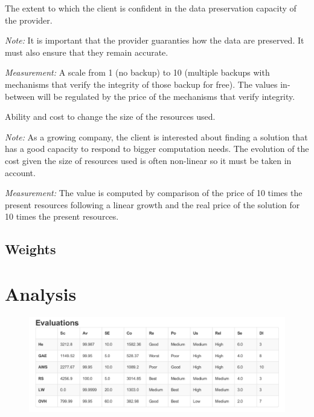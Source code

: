 \documentclass[a4paper,11pt]{article}
\begin{document}
\begin{description}[parsep=10pt,listparindent=\parindent,labelindent=\parindent,font=$\bullet$\ ]
  \item[Data Integrity:] The extent to which the client is confident in the data preservation capacity of the provider.
    \par \emph{Note:} It is important that the provider guaranties how the data are preserved. It must also ensure that they remain accurate.
    \par \emph{Measurement:} A scale from 1 (no backup) to 10 (multiple backups with mechanisms that verify the integrity of those backup for free). The values in-between will be regulated by the price of the mechanisms that verify integrity.

  \item[Scalability:] Ability and cost to change the size of the resources used.
    \par \emph{Note:} As a growing company, the client is interested about finding a solution that has a good capacity to respond to bigger computation needs. The evolution of the cost given the size of resources used is often non-linear so it must be taken in account.
    \par \emph{Measurement:} The value is computed by comparison of the price of 10 times the present resources following a linear growth and the real price of the solution for 10 times the present resources.

\end{description}


\subsection{Weights}


\section{Analysis}

\begin{figure}[h]
  \includegraphics[width=\textwidth]{img/Result/evaluation.pdf}
\end{figure}
\end{document}
